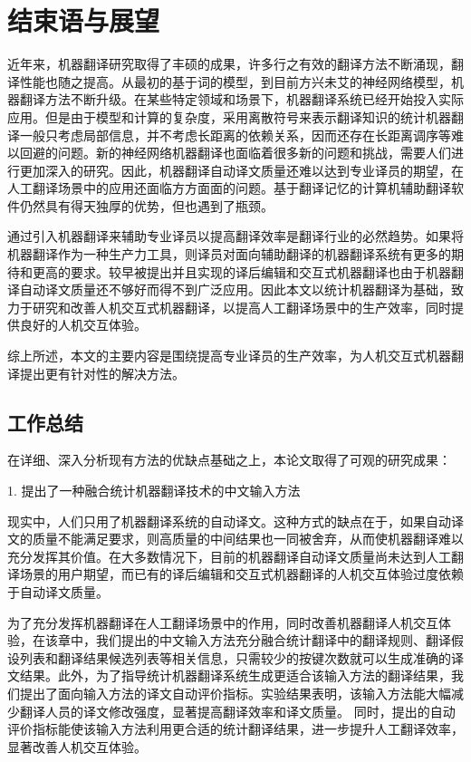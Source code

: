 
\chapter{结束语与展望}
\label{Chapter_conclusion}

近年来，机器翻译研究取得了丰硕的成果，许多行之有效的翻译方法不断涌现，翻译性能也随之提高。从最初的基于词的模型，到目前方兴未艾的神经网络模型，机器翻译方法不断升级。在某些特定领域和场景下，机器翻译系统已经开始投入实际应用。但是由于模型和计算的复杂度，采用离散符号来表示翻译知识的统计机器翻译一般只考虑局部信息，并不考虑长距离的依赖关系，因而还存在长距离调序等难以回避的问题。新的神经网络机器翻译也面临着很多新的问题和挑战，需要人们进行更加深入的研究。因此，机器翻译自动译文质量还难以达到专业译员的期望，在人工翻译场景中的应用还面临方方面面的问题。基于翻译记忆的计算机辅助翻译软件仍然具有得天独厚的优势，但也遇到了瓶颈。

通过引入机器翻译来辅助专业译员以提高翻译效率是翻译行业的必然趋势。如果将机器翻译作为一种生产力工具，则译员对面向辅助翻译的机器翻译系统有更多的期待和更高的要求。较早被提出并且实现的译后编辑和交互式机器翻译也由于机器翻译自动译文质量还不够好而得不到广泛应用。因此本文以统计机器翻译为基础，致力于研究和改善人机交互式机器翻译，以提高人工翻译场景中的生产效率，同时提供良好的人机交互体验。

综上所述，本文的主要内容是围绕提高专业译员的生产效率，为人机交互式机器翻译提出更有针对性的解决方法。

\section{工作总结}

在详细、深入分析现有方法的优缺点基础之上，本论文取得了可观的研究成果：

1. 提出了一种融合统计机器翻译技术的中文输入方法

现实中，人们只用了机器翻译系统的自动译文。这种方式的缺点在于，如果自动译文的质量不能满足要求，则高质量的中间结果也一同被舍弃，从而使机器翻译难以充分发挥其价值。在大多数情况下，目前的机器翻译自动译文质量尚未达到人工翻译场景的用户期望，而已有的译后编辑和交互式机器翻译的人机交互体验过度依赖于自动译文质量。

为了充分发挥机器翻译在人工翻译场景中的作用，同时改善机器翻译人机交互体验，在该章中，我们提出的中文输入方法充分融合统计翻译中的翻译规则、翻译假设列表和翻译结果候选列表等相关信息，只需较少的按键次数就可以生成准确的译文结果。此外，为了指导统计机器翻译系统生成更适合该输入方法的翻译结果，我们提出了面向输入方法的译文自动评价指标。实验结果表明，该输入方法能大幅减少翻译人员的译文修改强度，显著提高翻译效率和译文质量。 同时，提出的自动评价指标能使该输入方法利用更合适的统计翻译结果，进一步提升人工翻译效率，显著改善人机交互体验。


